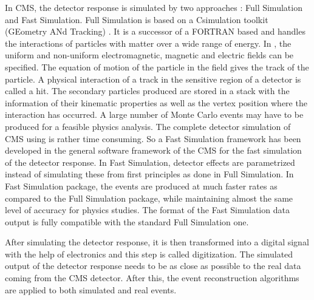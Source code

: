 In CMS, the detector response is simulated by two approaches \cite{Bayatian:2006nff} : Full Simulation and Fast Simulation. Full Simulation is based on a C\plusn\plus simulation toolkit \GEANTfour (GEometry ANd Tracking) \cite{Agostinelli:2002hh}. It is a successor of a FORTRAN based \GEANTthree and handles the interactions of particles with matter over a wide range of energy. In \GEANTfour, the uniform and non-uniform electromagnetic, magnetic and electric fields can be specified. The equation of motion of the particle in the field gives the track of the particle. A physical interaction of a track in the sensitive region of a detector is called a hit. The secondary particles produced are stored in a stack with the information of their kinematic properties as well as the vertex position where the interaction has occurred. A large number of Monte Carlo events may have to be produced for a feasible physics analysis. The complete detector simulation of CMS using \GEANTfour is rather time consuming. So a Fast Simulation framework \cite{Abdullin:2011zz} has been developed in the general software framework of the CMS for the fast simulation of the detector response. In Fast Simulation, detector effects are parametrized instead of simulating these from first principles as done in Full Simulation. In Fast Simulation package, the events are produced at much faster rates as compared to the Full Simulation package, while maintaining almost the same level of accuracy for physics studies. The format of the Fast Simulation data output is fully compatible with the standard Full Simulation one. 

After simulating the detector response, it is then transformed into a digital signal with the help of electronics and this step is called digitization. The simulated output of the detector response needs to be as close as possible to the real data coming from the CMS detector. After this, the event reconstruction algorithms are applied to both simulated and real events.
